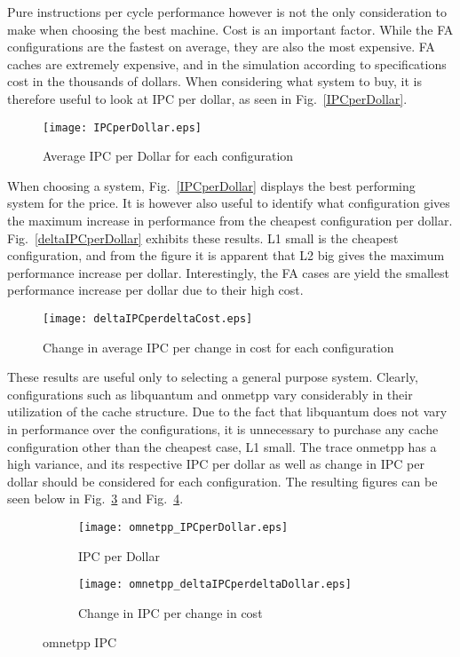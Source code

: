 \documentclass[FinalReport.tex]{subfiles}
\begin{document}
Pure instructions per cycle performance however is not the only consideration to make when choosing the best machine. Cost is an important factor. While the FA configurations are the fastest on average, they are also the most expensive. FA caches are extremely expensive, and in the simulation according to specifications cost in the thousands of dollars. When considering what system to buy, it is therefore useful to look at IPC per dollar, as seen in Fig.~\ref{IPCperDollar}.

\begin{figure}[H]
\centering
\texttt{[image: IPCperDollar.eps]}
\caption{Average IPC per Dollar for each configuration\label{fig:IPCperDollar}}
\end{figure}

When choosing a system, Fig.~\ref{IPCperDollar} displays the best performing system for the price. It is however also useful to identify what configuration gives the maximum increase in performance from the cheapest configuration per dollar. Fig.~\ref{deltaIPCperDollar} exhibits these results. L1 small is the cheapest configuration, and from the figure it is apparent that L2 big gives the maximum performance increase per dollar. Interestingly, the FA cases are yield the smallest performance increase per dollar due to their high cost.

\begin{figure}[H]
\centering
\texttt{[image: deltaIPCperdeltaCost.eps]}
\caption{Change in average IPC per change in cost for each configuration\label{fig:deltaIPCperDollar}}
\end{figure}

 These results are useful only to selecting a general purpose system.  Clearly, configurations such as libquantum and onmetpp vary considerably in their utilization of the cache structure. Due to the fact that libquantum does not vary in performance over the configurations, it is unnecessary to purchase any cache configuration other than the cheapest case, L1 small. The trace onmetpp has a high variance, and its respective IPC per dollar as well as change in IPC per dollar should be considered for each configuration. The resulting figures can be seen below in Fig.~\ref{fig:omnetppIPCperDollar} and Fig.~\ref{fig:deltaomnetppIPCperDollar}.

\begin{figure}[H]
\centering
\begin{subfigure}[b]{0.49\textwidth}
\texttt{[image: omnetpp\_IPCperDollar.eps]}
\caption{IPC per Dollar\label{fig:omnetppIPCperDollar}}
\end{subfigure}
\begin{subfigure}[b]{0.49\textwidth}
\texttt{[image: omnetpp\_deltaIPCperdeltaDollar.eps]}
\caption{Change in IPC per change in cost\label{fig:deltaomnetppIPCperDollar}}
\end{subfigure}
\caption{omnetpp IPC}\label{fig:omnetpp}
\end{figure}
\end{document}
